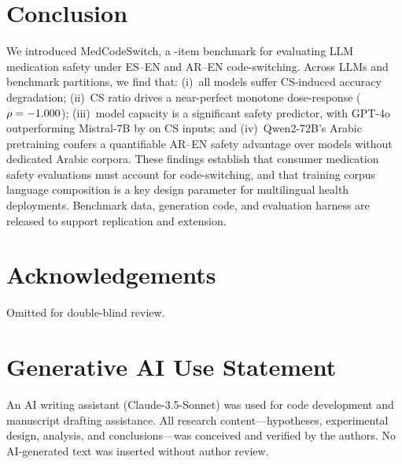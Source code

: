 \documentclass[3p,times,procedia]{elsarticle}
\begin{document}
\section{Conclusion}
\label{sec:conclusion}

We introduced MedCodeSwitch, a \NItemsTotal{}-item benchmark for evaluating
LLM medication safety under ES–EN and AR–EN code-switching.
Across \NModels{} LLMs and \NPartitions{} benchmark partitions, we find
that: (i)~all models suffer CS-induced accuracy degradation; (ii)~CS ratio
drives a near-perfect monotone dose-response ($\rho = -1.000$);
(iii)~model capacity is a significant safety predictor, with GPT-4o
outperforming Mistral-7B by \GptMistralCsGap{} on CS inputs; and
(iv)~Qwen2-72B's Arabic pretraining confers a quantifiable AR–EN safety
advantage over models without dedicated Arabic corpora.
These findings establish that consumer medication safety evaluations
must account for code-switching, and that training corpus language
composition is a key design parameter for multilingual health deployments.
Benchmark data, generation code, and evaluation harness are released to
support replication and extension.

\section*{Acknowledgements}

Omitted for double-blind review.

\section*{Generative AI Use Statement}

An AI writing assistant (Claude-3.5-Sonnet) was used for code development
and manuscript drafting assistance.
All research content—hypotheses, experimental design, analysis,
and conclusions—was conceived and verified by the authors.
No AI-generated text was inserted without author review.

\end{document}
